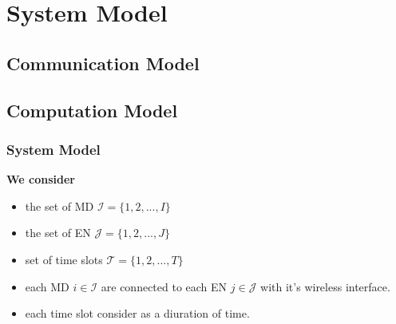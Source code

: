 \section{System Model}
\subsection{Communication Model}
\subsection{Computation Model}

\begin{frame}
	\frametitle{System Model}


\textbf{We consider}

\vspace{2mm}

	\begin{itemize}
		
		\item the set of MD $\mathcal{I} = \{1, 2, ..., I\}$ 
		
		\vspace{2mm}
		
		\item the set of EN $\mathcal{J} = \{1, 2, ..., J\}$
		
		\vspace{2mm}
		
		\item set of time slots $\mathcal{T} = \{1, 2, \ldots, T\}$
		
		\vspace{2mm}
		
		\item each MD $i \in \mathcal{I}$ are connected to each EN $j \in \mathcal{J}$ with it's wireless interface. 		
		
		\vspace{2mm}
		
		
		\item each time slot consider as a diuration of time. 
		
	\end{itemize}
	
\end{frame}

